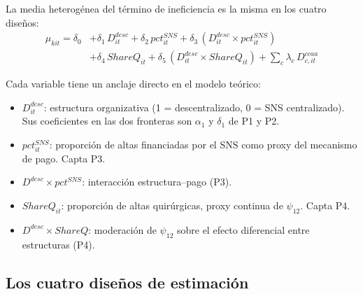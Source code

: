 \documentclass[12pt, a4paper]{article}
\begin{document}
La media heterogénea del término de ineficiencia es la misma en los cuatro
diseños:
\begin{align*}
  \mu_{kit} = \delta_0
    &+ \delta_1\, D^{desc}_{it}
     + \delta_2\, pct^{SNS}_{it}
     + \delta_3\, (D^{desc}_{it} \times pct^{SNS}_{it}) \\
    &+ \delta_4\, ShareQ_{it}
     + \delta_5\, (D^{desc}_{it} \times ShareQ_{it})
     + \sum_{c}\lambda_c\, D^{ccaa}_{c,it}
\end{align*}

Cada variable tiene un anclaje directo en el modelo teórico:
\begin{itemize}
  \item $D^{desc}_{it}$: estructura organizativa (1 = descentralizado, 0 = SNS
    centralizado). Sus coeficientes en las dos fronteras son $\alpha_1$ y
    $\delta_1$ de P1 y P2.
  \item $pct^{SNS}_{it}$: proporción de altas financiadas por el SNS como
    proxy del mecanismo de pago. Capta P3.
  \item $D^{desc} \times pct^{SNS}$: interacción estructura--pago (P3).
  \item $ShareQ_{it}$: proporción de altas quirúrgicas, proxy continua de
    $\psi_{12}$. Capta P4.
  \item $D^{desc} \times ShareQ$: moderación de $\psi_{12}$ sobre el efecto
    diferencial entre estructuras (P4).
\end{itemize}

\subsection{Los cuatro diseños de estimación}
\end{document}
